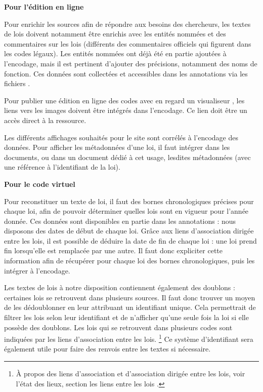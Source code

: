 \textbf{Pour l'édition en ligne}

Pour enrichir les sources afin de répondre aux besoins des chercheurs, les textes de lois doivent notamment être enrichis avec les entités nommées et des commentaires sur les lois (différents des commentaires officiels qui figurent dans les codes légaux). Les entités nommées ont déjà été en partie ajoutées à l’encodage, mais il est pertinent d’ajouter des précisions, notamment des noms de fonction. Ces données sont collectées et accessibles dans les annotations via les fichiers \JSON. 

Pour publier une édition en ligne des codes avec en regard un visualiseur \IIIF, les liens vers les images doivent être intégrés dans l’encodage. Ce lien doit être un accès direct à la ressource. 

Les différents affichages souhaités pour le site sont corrélés à l’encodage des données. Pour afficher les métadonnées d’une loi, il faut intégrer dans les documents, ou dans un document \TEI dédié à cet usage, lesdites métadonnées (avec une référence à l’identifiant \XML de la loi). 

\bigskip
\textbf{Pour le code virtuel}

Pour reconstituer un texte de loi, il faut des bornes chronologiques précises pour chaque loi, afin de pouvoir déterminer quelles lois sont en vigueur pour l’année donnée. Ces données sont disponibles en partie dans les annotations : nous disposons des dates de début de chaque loi. Grâce aux liens d’association dirigée entre les lois, il est possible de déduire la date de fin de chaque loi : une loi prend fin lorsqu’elle est remplacée par une autre. Il faut donc expliciter cette information afin de récupérer pour chaque loi des bornes chronologiques, puis les intégrer à l’encodage. 

Les textes de lois à notre disposition contiennent également des doublons : certaines lois se retrouvent dans plusieurs sources. Il faut donc trouver un moyen de les dédoublonner en leur attribuant un identifiant unique. Cela permettrait de filtrer les lois selon leur identifiant et de n’afficher qu’une seule fois la loi si elle possède des doublons. Les lois qui se retrouvent dans plusieurs codes sont indiquées par les liens d’association entre les lois. \footnote{À propos des liens d’association et d’association dirigée entre les lois, voir l’état des lieux, section \og les liens entre les lois \fg.} Ce système d’identifiant sera également utile pour faire des renvois entre les textes si nécessaire. 

